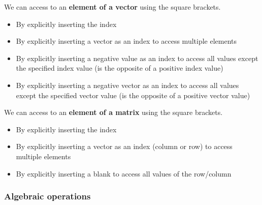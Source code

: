 \documentclass[a4paper]{article}
\begin{document}
    We can access to an \textbf{element of a vector} using the square brackets.
    \begin{itemize}
        \item By explicitly inserting the index
        

        \item By explicitly inserting a vector as an index to access multiple elements
        

        \item By explicitly inserting a negative value as an index to access all values except the specified index value (is the opposite of a positive index value)
        

        \item By explicitly inserting a negative vector as an index to access all values except the specified vector value (is the opposite of a positive vector value)
        
    \end{itemize}
    We can access to an \textbf{element of a matrix} using the square brackets.
    \begin{itemize}
        \item By explicitly inserting the index
        

        \item By explicitly inserting a vector as an index (column or row) to access multiple elements
        

        \item By explicitly inserting a blank to access all values of the row/column
        
    \end{itemize}

    \newpage

    \subsubsection{Algebraic operations}
\end{document}
